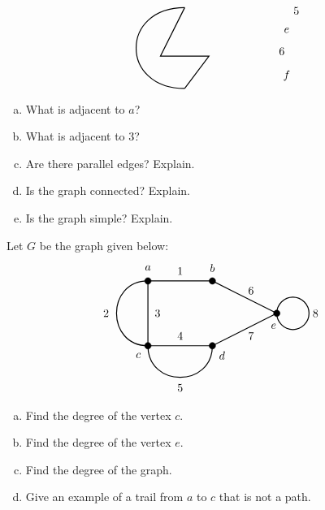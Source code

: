 \documentclass[12pt,letterpaper]{exam}
\begin{document}
\begin{questions}
\[\begin{tikzpicture}
	\node at (4.2,1.4) {$5$};	
	\node at (3.9,0.8) {$e$};
	\node at (3.75,0.15) {$6$};
	\node at (3.9,-0.6) {$f$};	
	
	\draw[line width=0.03cm] (0.75,1.5) to[bend right=90, distance=2cm] (0.75,-1); %
	\draw[line width=0.03cm] (0.75,-1) -- (1.5,0) -- (0,0) -- (0.75,1.5); %
	\end{tikzpicture}
	\]

\begin{enumerate}[(a)]
\item What is adjacent to $a$?
\item What is adjacent to 3?
\item Are there parallel edges? Explain.
\item Is the graph connected? Explain.
\item Is the graph simple? Explain. 
\end{enumerate}



\newpage
\question[10]  Let $G$ be the graph given below:
	\[
	\begin{tikzpicture}
	\draw[line width=0.03cm] (4,1) -- (2,0) -- (0,0) -- (0,2) -- (2,2) -- (4,1);
	\draw[line width=0.03cm] (0,0) to[bend left=90, distance=1.3cm] (0,2);
	\draw[line width=0.03cm] (0,0) to[bend right=90, distance=1.3cm] (2,0);
	\draw[line width=0.03cm] (4.5,1) circle (0.5);
	
	\draw[fill=black] (0,0) circle (0.1);
	\draw[fill=black] (0,2) circle (0.1);
	\draw[fill=black] (2,2) circle (0.1);
	\draw[fill=black] (2,0) circle (0.1);
	\draw[fill=black] (4,1) circle (0.1);
	
	\node at (1,2.3) {$1$};
	\node at (-1.3,1) {$2$};
	\node at (0.3,1) {$3$};
	\node at (1,0.3) {$4$};
	\node at (1,-1.3) {$5$};
	\node at (3.2,1.7) {$6$};
	\node at (3.2,0.3) {$7$};
	\node at (5.2,1) {$8$};
	
	\node at (0,2.4) {$a$};
	\node at (2,2.4) {$b$};
	\node at (-0.3,-0.3) {$c$};
	\node at (2.3,-0.3) {$d$};
	\node at (3.9,0.6) {$e$};
	\end{tikzpicture}
	\]

\begin{enumerate}[(a)]
\item Find the degree of the vertex $c$.
\item Find the degree of the vertex $e$. 
\item Find the degree of the graph. 
\item Give an example of a trail from $a$ to $c$ that is not a path. 
\end{enumerate}




\end{questions}
\end{document}
